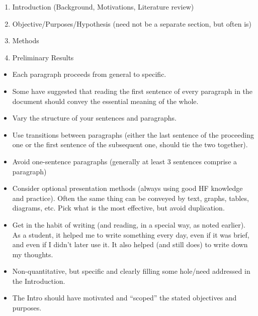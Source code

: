 \begin{enumerate}
	\item Introduction (Background, Motivations, Literature review)
	\item Objective/Purposes/Hypothesis (need not be a separate section, but often is)
	\item Methods
	\item Preliminary Results
\end{enumerate}

\begin{itemize}
  \item Each paragraph proceeds from general to specific.
  \item Some have suggested that reading the first sentence of every paragraph in the document
  should convey the essential meaning of the whole.
  \item Vary the structure of your sentences and paragraphs.
  \item Use transitions between paragraphs (either the last sentence of the proceeding one
  or the first sentence of the subsequent one, should tie the two together).
  \item Avoid one-sentence paragraphs (generally at least 3 sentences comprise a paragraph)
  \item Consider optional presentation methods (always using good HF knowledge and
  practice). Often the same thing can be conveyed by text, graphs, tables, diagrams,
  etc. Pick what is the most effective, but avoid duplication.
  \item Get in the habit of writing (and reading, in a special way, as noted earlier). As a student,
  it helped me to write something every day, even if it was brief, and even if I didn’t later use it. 
  It also helped (and still does) to write down my thoughts.
\end{itemize}

\begin{itemize}
  \item Non-quantitative, but specific and clearly filling some hole/need addressed in the
  Introduction.
  \item The Intro should have motivated and “scoped” the stated objectives and purposes.
\end{itemize}

